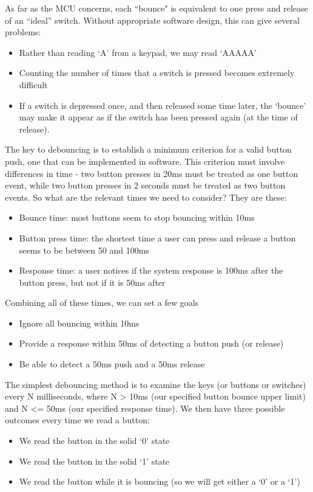 As far as the MCU concerns, each ``bounce" is equivalent to one press and release of an ``ideal” switch. 
Without appropriate software design, this can give several problems:
\begin{itemize}
    \item Rather than reading ‘A’ from a keypad, we may read ‘AAAAA’
    \item Counting the number of times that a switch is pressed becomes extremely difficult
    \item If a switch is depressed once, and then released some time later, the `bounce' may make it appear as if the switch has been pressed again (at the time of release). 
\end{itemize}


The key to debouncing is to establish a minimum criterion for a valid button push, one that can be implemented in software.  This criterion must involve differences in time - two button presses in 20ms must be treated as one button event, while two button presses in 2 seconds must be treated as two button events.  So what are the relevant times we need to consider?  They are these:
\begin{itemize}
    \item Bounce time:  most buttons seem to stop bouncing within 10ms
    \item Button press time: the shortest time a user can press and release a button seems to be between 50 and 100ms
    \item Response time: a user notices if the system response is 100ms after the button press, but not if it is 50ms after
\end{itemize}



Combining all of these times, we can set a few goals
\begin{itemize}
    \item Ignore all bouncing within 10ms
    \item Provide a response within 50ms of detecting a button push (or release)
    \item Be able to detect a 50ms push and a 50ms release    
\end{itemize}


The simplest debouncing method is to examine the keys (or buttons or switches) every N milliseconds, where N > 10ms (our specified button bounce upper limit) and N <= 50ms (our specified response time).   We then have three possible outcomes every time we read a button:
\begin{itemize}
    \item We read the button in the solid `0' state
    \item We read the button in the solid `1' state
    \item We read the button while it is bouncing (so we will get either a `0' or a `1')
\end{itemize}

